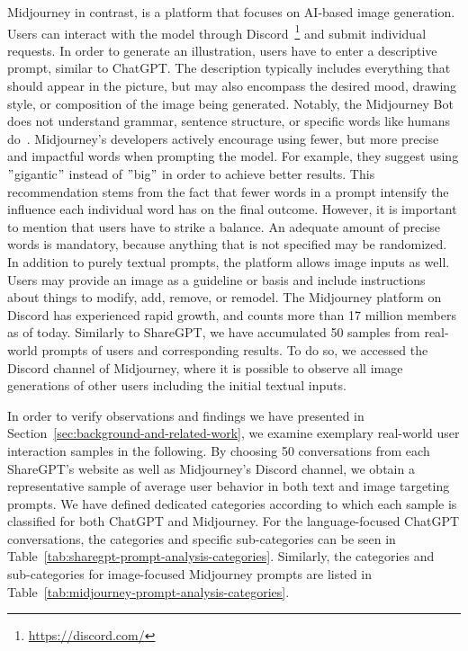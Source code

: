 Midjourney in contrast, is a platform that focuses on AI-based image generation.
Users can interact with the model through Discord~\footnote{\url{https://discord.com/}} and submit
individual requests.
In order to generate an illustration, users have to enter a descriptive prompt, similar to
ChatGPT\@.
The description typically includes everything that should appear in the picture, but may also
encompass the desired mood, drawing style, or composition of the image being generated.
Notably, the Midjourney Bot does not understand grammar, sentence structure, or specific words like
humans do~\cite{midjourney_documentation_2023}.
Midjourney's developers actively encourage using fewer, but more precise and impactful words when
prompting the model.
For example, they suggest using \("\)gigantic\("\) instead of \("\)big\("\) in order to achieve
better results.
This recommendation stems from the fact that fewer words in a prompt intensify the influence each
individual word has on the final outcome.
However, it is important to mention that users have to strike a balance.
An adequate amount of precise words is mandatory, because anything that is not specified may be
randomized.
In addition to purely textual prompts, the platform allows image inputs as well.
Users may provide an image as a guideline or basis and include instructions about things to modify,
add, remove, or remodel.
The Midjourney platform on Discord has experienced rapid growth, and counts more than 17 million
members as of today.
Similarly to ShareGPT, we have accumulated 50 samples from real-world prompts of users and
corresponding results.
To do so, we accessed the Discord channel of Midjourney, where it is possible to observe all image
generations of other users including the initial textual inputs.
\newline

In order to verify observations and findings we have presented in Section~\ref{sec:background-and-related-work},
we examine exemplary real-world user interaction samples in the following.
By choosing 50 conversations from each ShareGPT's website as well as Midjourney's Discord
channel, we obtain a representative sample of average user behavior in both text and image targeting prompts.
We have defined dedicated categories according to which each sample is classified for both
ChatGPT and Midjourney.
For the language-focused ChatGPT conversations, the categories and specific sub-categories can be
seen in Table~\ref{tab:sharegpt-prompt-analysis-categories}.
Similarly, the categories and sub-categories for image-focused Midjourney prompts are listed
in Table~\ref{tab:midjourney-prompt-analysis-categories}.

